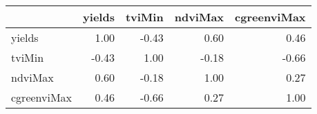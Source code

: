\begin{tabular}{lrrrr}
\toprule
{} &  yields &  tviMin &  ndviMax &  cgreenviMax \\
\midrule
yields      &    1.00 &   -0.43 &     0.60 &         0.46 \\
tviMin      &   -0.43 &    1.00 &    -0.18 &        -0.66 \\
ndviMax     &    0.60 &   -0.18 &     1.00 &         0.27 \\
cgreenviMax &    0.46 &   -0.66 &     0.27 &         1.00 \\
\bottomrule
\end{tabular}
